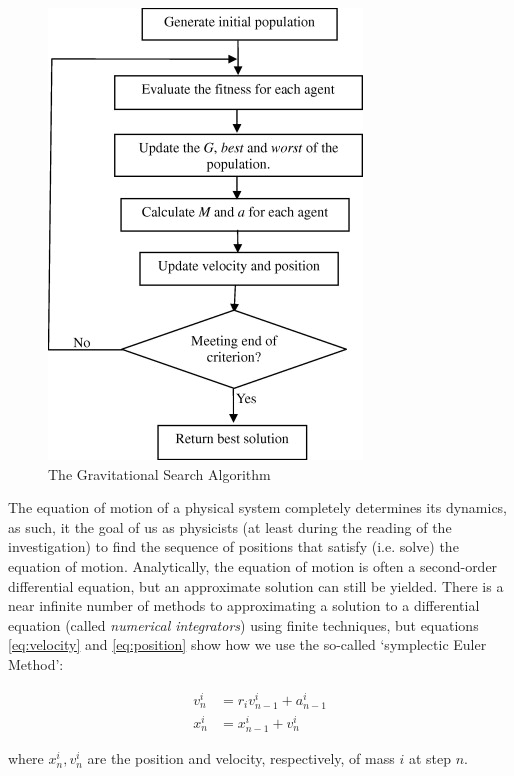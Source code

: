 \documentclass{article}
\begin{document}
        \begin{figure}
            \begin{center}
                \includegraphics{Images/GSA.jpg}
            \end{center}
            \caption{The Gravitational Search Algorithm}
        \end{figure}

        The equation of motion of a physical system completely determines its dynamics, as such, it the goal of us as physicists (at least during the reading of the investigation) to find the sequence of positions that satisfy (i.e. solve) the equation of motion.  Analytically, the equation of motion is often a second-order differential equation, but an approximate solution can still be yielded.  There is a near infinite number of methods to approximating a solution to a differential equation (called \emph{numerical integrators}) using finite techniques, but equations \ref{eq:velocity} and \ref{eq:position} show how we use the so-called `symplectic Euler Method':

        \begin{align}
            \label{eq:velocity} v_n^i &= r_i v_{n-1}^i + a_{n - 1}^i \\
            \label{eq:position} x_n^i &= x_{n - 1}^i + v_n^i
        \end{align}

        where $x_n^i, v_n^i$ are the position and velocity, respectively, of mass $i$ at step $n$.
\end{document}
